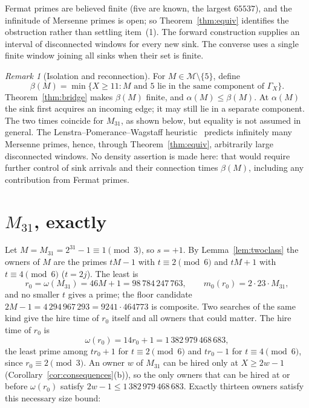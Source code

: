 \documentclass[11pt,a4paper]{article}
\theoremstyle{remark}
\newtheorem{remark}[theorem]{Remark}
\newcommand{\pow}{\mathcal{M}}   %
\begin{document}
Fermat primes are believed finite (five are known, the largest \(65537\)), and the infinitude of Mersenne primes is open; so Theorem~\ref{thm:equiv} identifies the obstruction rather than settling item~(1).
The forward construction supplies an interval of disconnected windows for every new sink. The converse uses a single finite window joining all sinks when their set is finite.

\begin{remark}[Isolation and reconnection]\label{rem:lpw}
For \(M\in\pow\setminus\{5\}\), define
\[
\beta(M)=\min\{X\ge11: M\text{ and }5\text{ lie in the same component of }\Gamma_X\}.
\]
Theorem~\ref{thm:bridge} makes \(\beta(M)\) finite, and \(\alpha(M)\le\beta(M)\).
At \(\alpha(M)\) the sink first acquires an incoming edge; it may still lie in a separate component. The two times coincide for \(M_{31}\), as shown below, but equality is not assumed in general.
The Lenstra--Pomerance--Wagstaff heuristic~\cite{Wagstaff} predicts infinitely many Mersenne primes, hence, through Theorem~\ref{thm:equiv}, arbitrarily large disconnected windows. No density assertion is made here: that would require further control of sink arrivals and their connection times \(\beta(M)\), including any contribution from Fermat primes.
\end{remark}

\section{\texorpdfstring{\(M_{31}\)}{M31}, exactly}\label{sec:m31}

Let \(M=M_{31}=2^{31}-1\equiv1\pmod 3\), so \(s=+1\).
By Lemma~\ref{lem:twoclass} the owners of \(M\) are the primes \(tM-1\) with \(t\equiv2\pmod 6\) and \(tM+1\) with \(t\equiv 4\pmod 6\) (\(t=2j\)).
The least is
\[
r_0=\omega(M_{31})=46M+1=98\,784\,247\,763,\qquad m_0(r_0)=2\cdot 23\cdot M_{31},
\]
and no smaller \(t\) gives a prime; the floor candidate \(2M-1=4\,294\,967\,293=9241\cdot464773\) is composite.
Two searches of the same kind give the hire time of \(r_0\) itself and all owners that could matter.
The hire time of \(r_0\) is
\[
\omega(r_0)=14r_0+1=1\,382\,979\,468\,683,
\]
the least prime among \(tr_0+1\) for \(t\equiv2\pmod6\) and \(tr_0-1\) for \(t\equiv4\pmod6\), since \(r_0\equiv2\pmod3\).
An owner \(w\) of \(M_{31}\) can be hired only at \(X\ge 2w-1\) (Corollary~\ref{cor:consequences}(b)), so the only owners that can be hired at or before \(\omega(r_0)\) satisfy \(2w-1\le 1\,382\,979\,468\,683\).
Exactly thirteen owners satisfy this necessary size bound:
\end{document}
